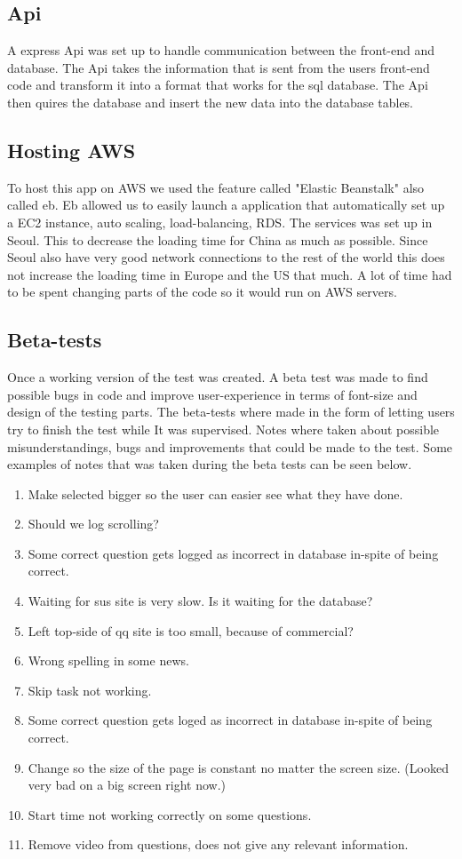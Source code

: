 \subsection{Api}
A express Api was set up to handle communication between the front-end and database. The Api takes the information that is sent from the users front-end code and transform it into a format that works for the sql database. The Api then quires the database and insert the new data into the database tables.

\subsection{Hosting AWS}
To host this app on AWS we used the feature called "Elastic Beanstalk" also called eb. Eb allowed us to easily launch a application that automatically set up a EC2 instance, auto scaling, load-balancing, RDS. The services was set up in Seoul. This to decrease the loading time for China as much as possible. Since Seoul also have very good network connections to the rest of the world this does not increase the loading time in Europe and the US that much. A lot of time had to be spent changing parts of the code so it would run on AWS servers.

\subsection{Beta-tests}
Once a working version of the test was created. A beta test was made to find possible bugs in code and improve user-experience in terms of font-size and design of the testing parts.
The beta-tests where made in the form of letting users try to finish the test while It was supervised. Notes where taken about possible misunderstandings, bugs and improvements that could be made to the test. Some examples of notes that was taken during the beta tests can be seen below. 

\begin{enumerate}
	\item Make selected bigger so the user can easier see what they have done.
	\item Should we log scrolling?
	\item Some correct question gets logged as incorrect in database in-spite of being correct.
	\item Waiting for sus site is very slow. Is it waiting for the database?
	\item Left top-side of qq site is too small, because of commercial?
	\item Wrong spelling in some news.
	\item Skip task not working.
	\item Some correct question gets loged as incorrect in database in-spite of being correct.
	\item Change so the size of the page is constant no matter the screen size. (Looked very bad on a big screen right now.)
	\item Start time not working correctly on some questions.
	\item Remove video from questions, does not give any relevant information.
\end{enumerate}

